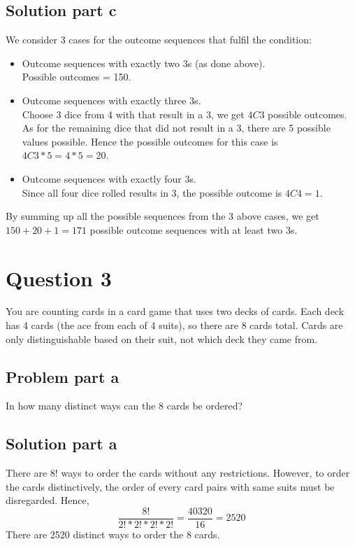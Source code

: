\documentclass[12pt]{article}%
\begin{document}
\subsection*{Solution part c}
We consider 3 cases for the outcome sequences that fulfil the condition:
\begin{itemize}
    \item Outcome sequences with exactly two 3s (as done above). \\Possible outcomes = 150.
    \item Outcome sequences with exactly three 3s.\\Choose 3 dice from 4 with that result in a 3, we get \begin{math}4C3\end{math} possible outcomes. As for the remaining dice that did not result in a 3, there are 5 possible values possible. Hence the possible outcomes for this case is \begin{math}4C3 * 5 = 4 * 5 = 20\end{math}. 
    \item Outcome sequences with exactly four 3s. \\Since all four dice rolled results in 3, the possible outcome is \begin{math}4C4=1\end{math}.
\end{itemize}
By summing up all the possible sequences from the 3 above cases, we get \begin{math}150 + 20 + 1 = 171\end{math} possible outcome sequences with at least two 3s.
\newpage
\section*{Question 3}
You are counting cards in a card game that uses two decks of cards. Each deck has 4 cards (the ace from each of 4 suits), so there are 8 cards total. Cards are only distinguishable based on their suit, not which deck they came from.

\subsection*{Problem part a}
In how many distinct ways can the 8 cards be ordered?
\subsection*{Solution part a}
There are \begin{math}8!\end{math} ways to order the cards without any restrictions. However, to order the cards distinctively, the order of every card pairs with same suits must be disregarded. Hence, 
\begin{equation}
\frac{8!}{2!*2!*2!*2!}=\frac{40320}{16}=2520
\end{equation}
There are 2520 distinct ways to order the 8 cards.
\end{document}

